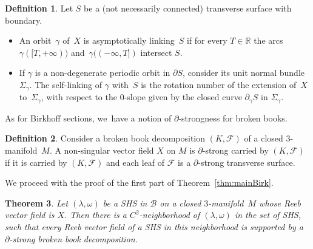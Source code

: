 \documentclass[JEP,XML,SOM,Unicode,NoEqCountersInSection,NoFloatCountersInSection,published]{cedram}
\newcommand{\threemanifold}{$3$\nobreakdash-mani\-fold\xspace}
\newtheorem{theorem}{Theorem}[section]
\theoremstyle{definition}
\newtheorem{defi}[theorem]{Definition}
\newcommand\R{\mathbb{R}}
\begin{document}
\begin{defi}
Let $S$ be a (not necessarily connected)
transverse surface with boundary.
\begin{itemize}
\item
An orbit~$\gamma$ of~$X$ is asymptotically linking~$S$ if for every $T\in\R$ the arcs $\gamma([T, +\infty))$ and~$\gamma((-\infty, T])$ intersect $S$.

\item
If $\gamma$ is a non-degenerate periodic orbit in $\partial S$, consider its unit normal bundle~$\Sigma_\gamma$. The self-linking of $\gamma$ with~$S$ is the rotation number of the extension of~$X$ to~$\Sigma_\gamma$, with respect to the 0-slope given by the closed curve $\partial_\gamma S$ in $\Sigma_\gamma$.
\end{itemize}

\end{defi}

As for Birkhoff sections, we~have a notion of $\partial$-strongness for broken books.

\begin{defi}\label{defn-bbddelta}
Consider a broken book decomposition $(K,\mathcal{F})$ of a closed \threemanifold~$M$. A non-singular vector field $X$ on $M$ is $\partial$-strong carried by $(K,\mathcal{F})$ if it is carried by $(K,\mathcal{F})$ and each leaf of $\mathcal{F}$ is a $\partial$-strong transverse surface.
\end{defi}

We proceed with the proof of the first part of Theorem~\ref{thm:mainBirk}.

\begin{theorem}\label{thm:bbook}
Let $(\lambda,\omega)$ be a SHS in $\mathcal{B}$ on a closed \threemanifold~$M$ whose Reeb vector field is $X$. Then there is a $C^2$-neighborhood of $(\lambda,\omega)$ in the set of SHS, such that every Reeb vector field of a SHS in this neighborhood is supported by a $\partial$-strong broken book decomposition.
\end{theorem}
\end{document}
